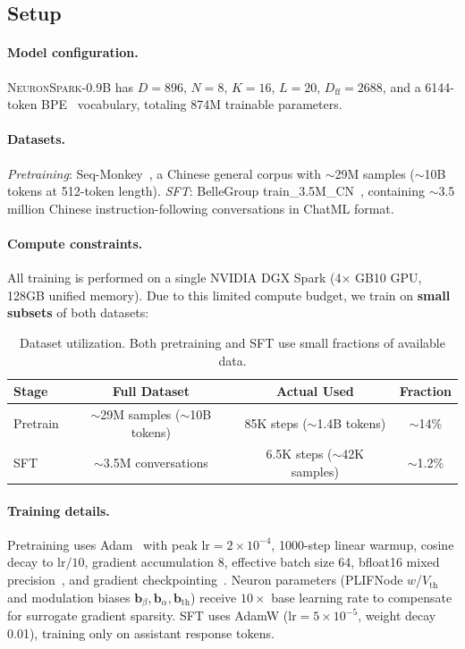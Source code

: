 \documentclass[10pt,twocolumn]{article}
\newcommand{\model}{\textsc{NeuronSpark}}
\newcommand{\vth}{V_{\text{th}}}
\begin{document}
\subsection{Setup}

\paragraph{Model configuration.}
\model{}-0.9B has $D=896$, $N=8$, $K=16$, $L=20$, $D_{\text{ff}}=2688$, and a 6144-token BPE~\citep{sennrich2016neural} vocabulary, totaling 874M trainable parameters.

\paragraph{Datasets.}
\emph{Pretraining}: Seq-Monkey~\citep{seqmonkey2023}, a Chinese general corpus with $\sim$29M samples ($\sim$10B tokens at 512-token length).
\emph{SFT}: BelleGroup train\_3.5M\_CN~\citep{bellegroup2023}, containing $\sim$3.5 million Chinese instruction-following conversations in ChatML format.

\paragraph{Compute constraints.}
All training is performed on a single NVIDIA DGX Spark (4$\times$ GB10 GPU, 128GB unified memory).
Due to this limited compute budget, we train on \textbf{small subsets} of both datasets:

\begin{table}[H]
\centering
\caption{Dataset utilization. Both pretraining and SFT use small fractions of available data.}
\label{tab:data}
\begin{tabular}{lccc}
\toprule
\textbf{Stage} & \textbf{Full Dataset} & \textbf{Actual Used} & \textbf{Fraction} \\
\midrule
Pretrain & $\sim$29M samples ($\sim$10B tokens) & 85K steps ($\sim$1.4B tokens) & $\sim$14\% \\
SFT & $\sim$3.5M conversations & 6.5K steps ($\sim$42K samples) & $\sim$1.2\% \\
\bottomrule
\end{tabular}
\end{table}

\paragraph{Training details.}
Pretraining uses Adam~\citep{loshchilov2019decoupled} with peak $\text{lr}=2\times10^{-4}$, 1000-step linear warmup, cosine decay to $\text{lr}/10$, gradient accumulation 8, effective batch size 64, bfloat16 mixed precision~\citep{micikevicius2018mixed}, and gradient checkpointing~\citep{chen2016training}.
Neuron parameters (PLIFNode $w$/$\vth$ and modulation biases $\mathbf{b}_\beta, \mathbf{b}_\alpha, \mathbf{b}_{\text{th}}$) receive $10\times$ base learning rate to compensate for surrogate gradient sparsity.
SFT uses AdamW ($\text{lr}=5\times10^{-5}$, weight decay 0.01), training only on assistant response tokens.
\end{document}
